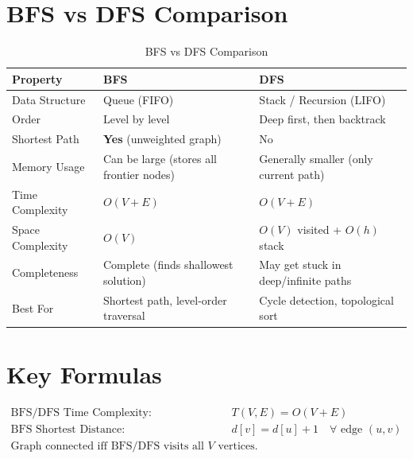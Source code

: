 \documentclass[12pt,a4paper]{article}
\begin{document}
\newpage

\section{BFS vs DFS Comparison}

\begin{table}[h!]
\centering
\renewcommand{\arraystretch}{1.5}
\begin{tabular}{|l|p{5.5cm}|p{5.5cm}|}
\hline
\textbf{Property}     & \textbf{BFS}                         & \textbf{DFS}                          \\
\hline
Data Structure        & Queue (FIFO)                          & Stack / Recursion (LIFO)              \\
Order                 & Level by level                        & Deep first, then backtrack            \\
Shortest Path         & \textbf{Yes} (unweighted graph)       & No                                    \\
Memory Usage          & Can be large (stores all frontier nodes) & Generally smaller (only current path) \\
Time Complexity       & $O(V+E)$                             & $O(V+E)$                             \\
Space Complexity      & $O(V)$                               & $O(V)$ visited + $O(h)$ stack         \\
Completeness          & Complete (finds shallowest solution)  & May get stuck in deep/infinite paths  \\
Best For              & Shortest path, level-order traversal  & Cycle detection, topological sort     \\
\hline
\end{tabular}
\caption{BFS vs DFS Comparison}
\end{table}

\section{Key Formulas}
\begin{align}
\text{BFS/DFS Time Complexity:}\quad & T(V,E) = O(V + E) \\
\text{BFS Shortest Distance:}\quad    & d[v] = d[u] + 1 \quad \forall \text{ edge } (u,v) \\
\text{Graph connected iff BFS/DFS visits all } V \text{ vertices.}
\end{align}
\end{document}
